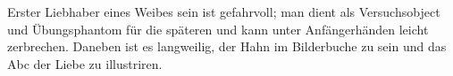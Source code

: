 Erster Liebhaber eines Weibes sein ist gefahrvoll; man dient als Versuchsobject und Übungsphantom für die späteren und kann unter Anfängerhänden leicht zerbrechen. Daneben ist es langweilig, der Hahn im Bilderbuche zu sein und das Abc der Liebe zu illustriren.
\par

